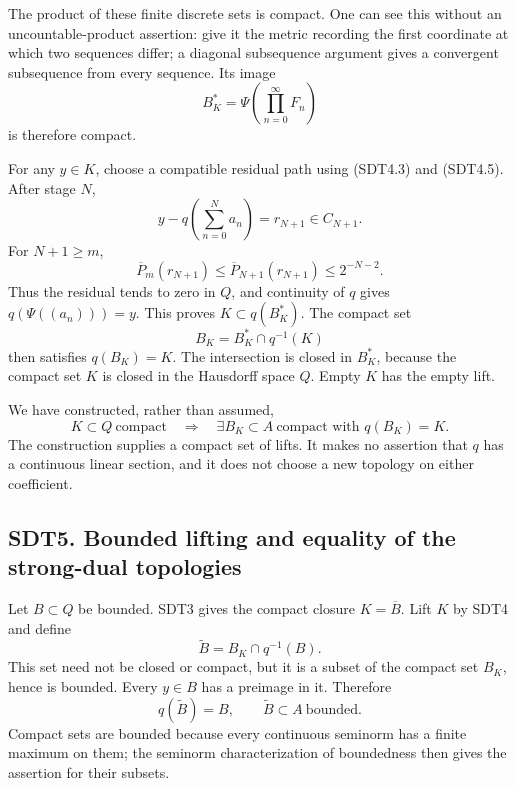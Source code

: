 The product of these finite discrete sets is compact. One can see this
without an uncountable-product assertion: give it the metric recording
the first coordinate at which two sequences differ; a diagonal
subsequence argument gives a convergent subsequence from every sequence.
Its image \[
B_K^*=\Psi\left(\prod_{n=0}^\infty F_n\right)
\tag{SDT4.8}
\] is therefore compact.

For any \(y\in K\), choose a compatible residual path using (SDT4.3) and
(SDT4.5). After stage \(N\), \[
y-q\left(\sum_{n=0}^N a_n\right)=r_{N+1}\in C_{N+1}.
\] For \(N+1\ge m\), \[
\overline P_m(r_{N+1})
\le\overline P_{N+1}(r_{N+1})
\le2^{-N-2}.
\tag{SDT4.9}
\] Thus the residual tends to zero in \(Q\), and continuity of \(q\)
gives \(q(\Psi((a_n)))=y\). This proves \(K\subset q(B_K^*)\). The
compact set \[
B_K=B_K^*\cap q^{-1}(K)
\tag{SDT4.10}
\] then satisfies \(q(B_K)=K\). The intersection is closed in \(B_K^*\),
because the compact set \(K\) is closed in the Hausdorff space \(Q\).
Empty \(K\) has the empty lift.

We have constructed, rather than assumed, \[
\boxed{K\subset Q\ \text{compact}\quad\Longrightarrow\quad
\exists B_K\subset A\ \text{compact with }q(B_K)=K.}
\tag{SDT4.11}
\] The construction supplies a compact set of lifts. It makes no
assertion that \(q\) has a continuous linear section, and it does not
choose a new topology on either coefficient.

\subsection{SDT5. Bounded lifting and equality of the strong-dual
topologies}\label{sdt5.-bounded-lifting-and-equality-of-the-strong-dual-topologies}

Let \(B\subset Q\) be bounded. SDT3 gives the compact closure
\(K=\overline B\). Lift \(K\) by SDT4 and define \[
\widetilde B=B_K\cap q^{-1}(B).
\tag{SDT5.1}
\] This set need not be closed or compact, but it is a subset of the
compact set \(B_K\), hence is bounded. Every \(y\in B\) has a preimage
in it. Therefore \[
\boxed{q(\widetilde B)=B,\qquad \widetilde B\subset A\ \text{bounded}.}
\tag{SDT5.2}
\] Compact sets are bounded because every continuous seminorm has a
finite maximum on them; the seminorm characterization of boundedness
then gives the assertion for their subsets.

